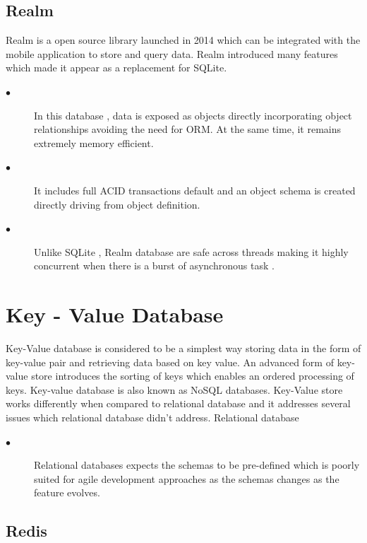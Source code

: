 \subsection{Realm}

		Realm is a open source library launched in 2014 which can be integrated with the mobile application to store and query data. Realm introduced many features which made it appear as a replacement for SQLite.  

\begin{description}
  \item[$\bullet$] In this database , data is exposed as objects directly incorporating object relationships avoiding the need for ORM. At the same time, it remains extremely memory efficient. 
   \item[$\bullet$] It includes full ACID transactions default and an object schema is created directly driving from object definition.
   \item[$\bullet$] Unlike SQLite , Realm database are safe across threads making it highly concurrent when there is a burst of asynchronous task .  
\end{description}  


\section{Key - Value Database}

			Key-Value database is considered to be a simplest way storing data in the form of key-value pair and retrieving data based on key value. An advanced form of key-value store introduces the sorting of keys which enables an ordered processing of keys. Key-value database is also known as NoSQL databases. Key-Value store works differently when compared to relational database and it addresses several issues which relational database didn't address. Relational database 

\begin{description}
	\item[$\bullet$] Relational databases expects the schemas to be pre-defined which is poorly suited for agile development approaches as the schemas changes as the feature evolves.
	
\end{description}			
			
		
			
\subsection{Redis}

